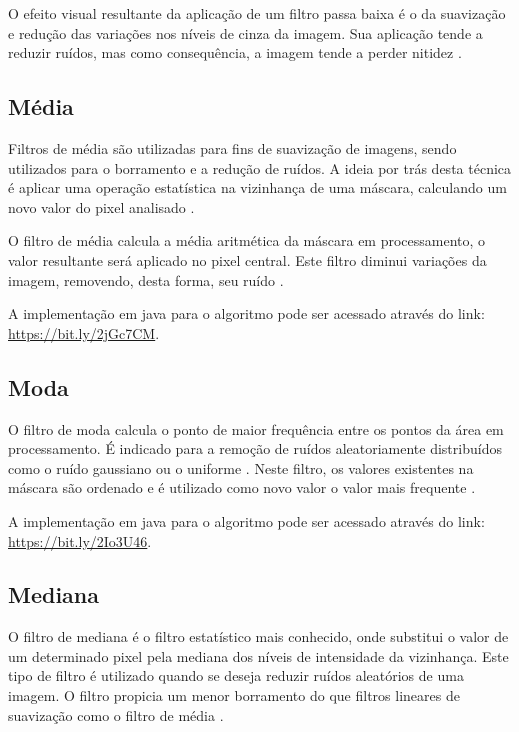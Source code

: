 \documentclass[
	12pt,				%
	oneside,			%
	a4paper,			%
	english,			%
	french,				%
	spanish,			%
	brazil,				%
	]{abntex2}
\begin{document}
O efeito visual resultante da aplicação de um filtro passa baixa é o da suavização e redução das variações nos níveis de cinza da imagem. Sua aplicação tende a reduzir ruídos, mas como consequência, a imagem tende a perder nitidez \cite{conciAzevedoLeta:2008}.

\subsection{Média}
Filtros de média são utilizadas para fins de suavização de imagens, sendo utilizados para o borramento e a redução de ruídos. A ideia por trás desta técnica é aplicar uma operação estatística na vizinhança de uma máscara, calculando um novo valor do pixel analisado \cite{gonzalesWoods:2008}. 

O filtro de média calcula a média aritmética da máscara em processamento, o valor resultante será aplicado no pixel central. Este filtro diminui variações da imagem, removendo, desta forma, seu ruído \cite{gonzalesWoods:2008}.

A implementação em java para o algoritmo pode ser acessado através do link: \url{https://bit.ly/2jGc7CM}. 

\subsection{Moda}
O filtro de moda calcula o ponto de maior frequência entre os pontos da área em processamento. É indicado para a remoção de ruídos aleatoriamente distribuídos como o ruído gaussiano ou o uniforme \cite{gonzalesWoods:2008}. Neste filtro, os valores existentes na máscara são ordenado e é utilizado como novo valor o valor mais frequente \cite{conciAzevedoLeta:2008}.

A implementação em java para o algoritmo pode ser acessado através do link: \url{https://bit.ly/2Io3U46}.

\subsection{Mediana}

O filtro de mediana é o filtro estatístico mais conhecido, onde substitui o valor de um determinado pixel pela mediana dos níveis de intensidade da vizinhança. Este tipo de filtro é utilizado quando se deseja reduzir ruídos aleatórios de uma imagem. O filtro propicia um menor borramento do que filtros lineares de suavização como o filtro de média \cite{gonzalesWoods:2008}.
\end{document}
